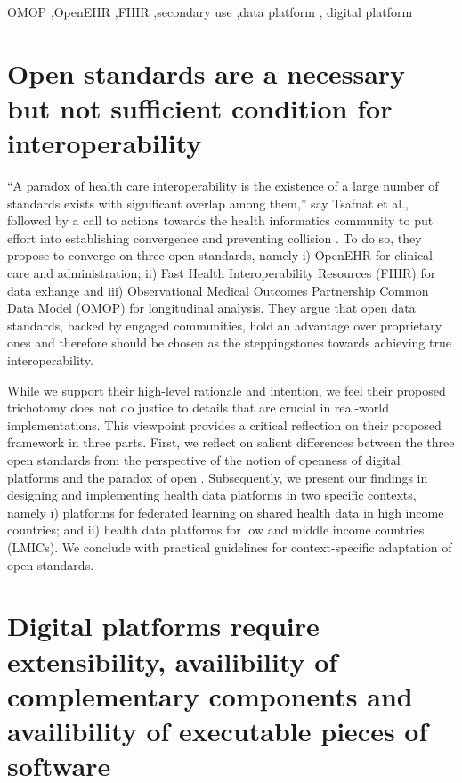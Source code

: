 \documentclass[
  authoryear]{elsarticle}
\begin{document}
\begin{frontmatter}
\begin{keyword}
    OMOP \sep OpenEHR \sep FHIR \sep secondary use \sep data
platform \sep 
    digital platform
\end{keyword}
\end{frontmatter}
    
\section{Open standards are a necessary but not sufficient condition for
interoperability}\label{open-standards-are-a-necessary-but-not-sufficient-condition-for-interoperability}

``A paradox of health care interoperability is the existence of a large
number of standards exists with significant overlap among them,'' say
Tsafnat et al., followed by a call to actions towards the health
informatics community to put effort into establishing convergence and
preventing collision \citep{tsafnat2024converge}. To do so, they propose
to converge on three open standards, namely i) OpenEHR for clinical care
and administration; ii) Fast Health Interoperability Resources (FHIR)
for data exhange and iii) Observational Medical Outcomes Partnership
Common Data Model (OMOP) for longitudinal analysis. They argue that open
data standards, backed by engaged communities, hold an advantage over
proprietary ones and therefore should be chosen as the steppingstones
towards achieving true interoperability.

While we support their high-level rationale and intention, we feel their
proposed trichotomy does not do justice to details that are crucial in
real-world implementations. This viewpoint provides a critical
reflection on their proposed framework in three parts. First, we reflect
on salient differences between the three open standards from the
perspective of the notion of openness of digital platforms
\citep{dereuver2018digital} and the paradox of open
\citep{keller2021paradox}. Subsequently, we present our findings in
designing and implementing health data platforms in two specific
contexts, namely i) platforms for federated learning on shared health
data in high income countries; and ii) health data platforms for low and
middle income countries (LMICs). We conclude with practical guidelines
for context-specific adaptation of open standards.

\section{Digital platforms require extensibility, availibility of
complementary components and availibility of executable pieces of
software}\label{digital-platforms-require-extensibility-availibility-of-complementary-components-and-availibility-of-executable-pieces-of-software}
\end{document}
